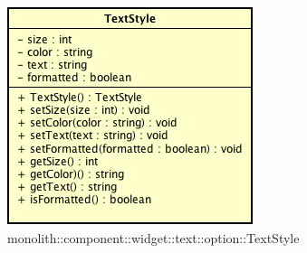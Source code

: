 \label{monolith::component::widget::text::option::TextStyle}
\begin{figure}[H]
	\centering
	\includegraphics[scale=0.5]{Sezioni/SottosezioniST/img/TextStyle.png}
	\caption{monolith::component::widget::text::option::TextStyle}
\end{figure}

